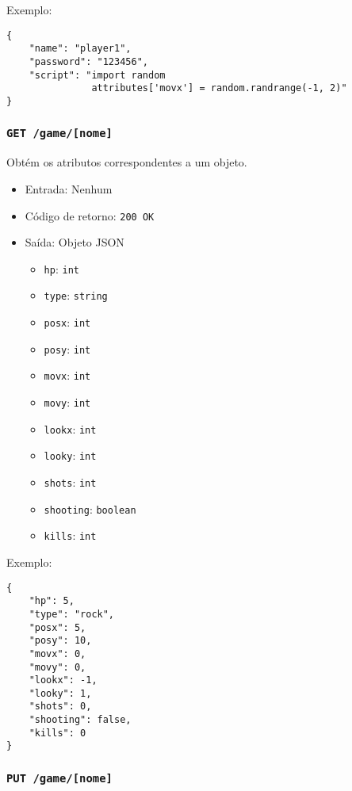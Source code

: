 \documentclass[12pt,a4paper]{article}
\begin{document}
Exemplo:

\begin{verbatim}
{
    "name": "player1",
    "password": "123456",
    "script": "import random
               attributes['movx'] = random.randrange(-1, 2)"
}
\end{verbatim}

\subsubsection{\texttt{GET /game/[nome]}}

Obtém os atributos correspondentes a um objeto.

\begin{itemize}
	\item Entrada: Nenhum
	\item Código de retorno: \texttt{200 OK}
	\item Saída: Objeto JSON
		\begin{itemize}
			\item \texttt{hp}: \texttt{int}
			\item \texttt{type}: \texttt{string}
			\item \texttt{posx}: \texttt{int}
			\item \texttt{posy}: \texttt{int}
			\item \texttt{movx}: \texttt{int}
			\item \texttt{movy}: \texttt{int}
			\item \texttt{lookx}: \texttt{int}
			\item \texttt{looky}: \texttt{int}
			\item \texttt{shots}: \texttt{int}
			\item \texttt{shooting}: \texttt{boolean}
			\item \texttt{kills}: \texttt{int}
		\end{itemize}
\end{itemize}

Exemplo:

\begin{verbatim}
{
    "hp": 5,
    "type": "rock",
    "posx": 5,
    "posy": 10,
    "movx": 0,
    "movy": 0,
    "lookx": -1,
    "looky": 1,
    "shots": 0,
    "shooting": false,
    "kills": 0
}
\end{verbatim}

\subsubsection{\texttt{PUT /game/[nome]}}
\end{document}
